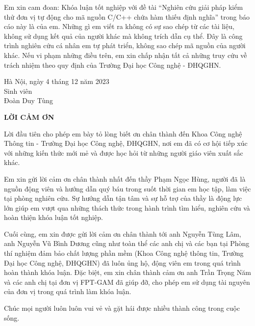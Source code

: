 Em xin cam đoan: Khóa luận tốt nghiệp với đề tài “Nghiên cứu giải pháp kiểm thử đơn vị tự động cho mã nguồn C/C++ chứa hàm thiếu định nghĩa” trong báo cáo này là của em. Những gì em viết ra không có sự sao chép từ các tài liệu, không sử dụng kết quả của người khác mà không trích dẫn cụ thể. Đây là công trình nghiên cứu cá nhân em tự phát triển, không sao chép mã nguồn của người khác. Nếu vi phạm những điều trên, em xin chấp nhận tất cả những truy cứu về trách nhiệm theo quy định của Trường Đại học Công nghệ - ĐHQGHN.

\begin{flushright}
	\begin{varwidth}{\linewidth}\centering
		Hà Nội, ngày 4 tháng 12 năm 2023\\
		Sinh viên\\[2cm]
		Đoàn Duy Tùng
	\end{varwidth}
\end{flushright}

\newpage

\begin{center}
    \textbf{LỜI CẢM ƠN}
\end{center}

Lời đầu tiên cho phép em bày tỏ lòng biết ơn chân thành đến  Khoa Công nghệ Thông tin - Trường Đại học Công nghệ, ĐHQGHN, nơi em đã có cơ hội tiếp xúc với những kiến thức mới mẻ và được học hỏi từ những người giáo viên xuất sắc khác.

Em xin gửi lời cảm ơn chân thành nhất đến thầy Phạm Ngọc Hùng, người đã là nguồn động viên và hướng dẫn quý báu trong suốt thời gian em học tập, làm việc tại phòng nghiên cứu. Sự hướng dẫn tận tâm và sự hỗ trợ của thầy là động lực lớn giúp em vượt qua những thách thức trong hành trình tìm hiểu, nghiên cứu và hoàn thiện khóa luận tốt nghiệp.

Cuối cùng, em xin được gửi lời cảm ơn chân thành tới anh Nguyễn Tùng Lâm, anh Nguyễn Vũ Bình Dương cũng như toàn thể các anh chị và các bạn tại Phòng thí nghiệm đảm bảo chất lượng phần mềm (Khoa Công nghệ thông tin, Trường Đại học Công nghệ, ĐHQGHN) đã luôn ủng hộ, động viên em trong quá trình hoàn thành khóa luận. Đặc biệt, em xin chân thành cảm ơn anh Trần Trọng Năm và các anh chị tại đơn vị FPT-GAM đã giúp đỡ, cho phép em sử dụng tài nguyên của đơn vị trong quá trình làm khóa luận.

Chúc mọi người luôn luôn vui vẻ và gặt hái được nhiều thành công trong cuộc sống.

